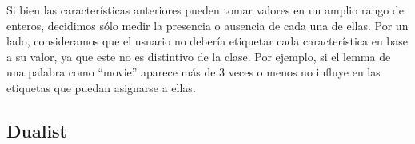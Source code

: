 Si bien las características anteriores pueden tomar valores en un amplio rango de enteros, decidimos sólo medir la presencia o ausencia de cada una de ellas. Por un lado, consideramos que el usuario no debería etiquetar cada característica en base a su valor, ya que este no es distintivo de la clase. Por ejemplo, si el lemma de una palabra como ``movie'' aparece más de 3 veces o menos no influye en las etiquetas que puedan asignarse a ellas.

\subsection{Dualist}
